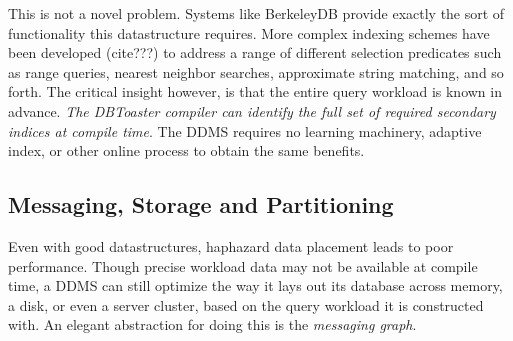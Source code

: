 
This is not a novel problem.  Systems like BerkeleyDB\cite{berkeleydb} provide exactly the sort of functionality this datastructure requires.  More complex indexing schemes have been developed (cite???) to address a range of different selection predicates such as range queries, nearest neighbor searches, approximate string matching, and so forth.  The critical insight however, is that the entire query workload is known in advance.  \textit{The DBToaster compiler can identify the full set of required secondary indices at compile time}.  The DDMS requires no learning machinery, adaptive index, or other online process to obtain the same benefits.


\subsection{Messaging, Storage and Partitioning}
Even with good datastructures, haphazard data placement leads to poor performance.  Though precise workload data may not be available at compile time, a DDMS can still optimize the way it lays out its database across memory, a disk, or even a server cluster, based on the query workload it is constructed with.  An elegant abstraction for doing this is the \textit{messaging graph}.

